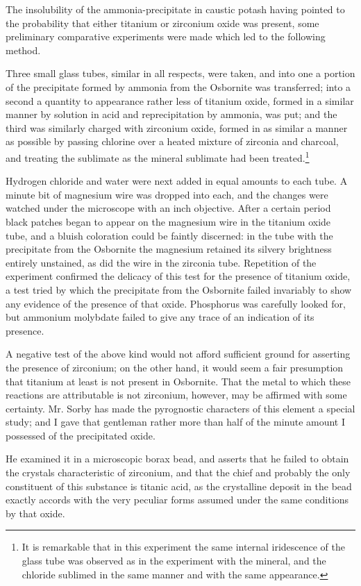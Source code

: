 \documentclass[a4paper, 12pt, oneside]{article}
\begin{document}
The insolubility of the ammonia-precipitate in caustic potash having pointed to the probability that either titanium or zirconium oxide was present, some preliminary comparative experiments were made which led to the following method.

Three small glass tubes, similar in all respects, were taken, and into one a portion of the precipitate formed by ammonia from the Osbornite was transferred; into a second a quantity to appearance rather less of titanium oxide, formed in a similar manner by solution in acid and reprecipitation by ammonia, was put; and the third was similarly charged with zirconium oxide, formed in as similar a manner as possible by passing chlorine over a heated mixture of zirconia and charcoal, and treating the sublimate as the mineral sublimate had been treated.\footnote{It is remarkable that in this experiment the same internal iridescence of the glass tube was observed as in the experiment with the mineral, and the chloride sublimed in the same manner and with the same appearance.}

Hydrogen chloride and water were next added in equal amounts to each tube. A minute bit of magnesium wire was dropped into each, and the changes were watched under the microscope with an inch objective. After a certain period black patches began to appear on the magnesium wire in the titanium oxide tube, and a bluish coloration could be faintly discerned: in the tube with the precipitate from the Osbornite the magnesium retained its silvery brightness entirely unstained, as did the wire in the zirconia tube. Repetition of the experiment confirmed the delicacy of this test for the presence of titanium oxide, a test tried by which the precipitate from the Osbornite failed invariably to show any evidence of the presence of that oxide. Phosphorus was carefully looked for, but ammonium molybdate failed to give any trace of an indication of its presence.

A negative test of the above kind would not afford sufficient ground for asserting the presence of zirconium; on the other hand, it would seem a fair presumption that titanium at least is not present in Osbornite. That the metal to which these reactions are attributable is not zirconium, however, may be affirmed with some certainty. Mr. Sorby has made the pyrognostic characters of this element a special study; and I gave that gentleman rather more than half of the minute amount I possessed of the precipitated oxide.

He examined it in a microscopic borax bead, and asserts that he failed to obtain the crystals characteristic of zirconium, and that the chief and probably the only constituent of this substance is titanic acid, as the crystalline deposit in the bead exactly accords with the very peculiar forms assumed under the same conditions by that oxide.
\end{document}
